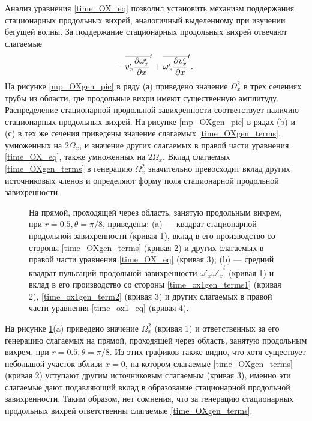 Анализ уравнения \eqref{time_OX_eq} позволил установить механизм поддержания стационарных продольных вихрей, аналогичный выделенному при изучении бегущей волны. За поддержание стационарных продольных вихрей отвечают слагаемые 
\begin{equation} \label{time_OXgen_terms}
- \overline{v'_x \frac{\partial \omega'_x}{\partial x}}^t + \overline{\omega'_x \frac{\partial v'_x}{\partial x}}^t. 
\end{equation}
На рисунке \ref{mp_OXgen_pic} в ряду (а) приведено значение $\Omega_x^2$ в трех сечениях трубы из области, где продольные вихри имеют существенную амплитуду. Распределение стационарной продольной завихренности соответствует наличию стационарных продольных вихрей. На рисунке \ref{mp_OXgen_pic} в рядах (b) и (с) в тех же сечения приведены значение слагаемых \eqref{time_OXgen_terms}, умноженных на $2\Omega_x$, и значение других слагаемых в правой части уравнения \eqref{time_OX_eq}, также умноженных на $2\Omega_x$. Вклад слагаемых \eqref{time_OXgen_terms} в генерацию $\Omega_x^2$ значительно превосходит вклад других источниковых членов и определяют форму поля стационарной продольной завихренности. 

\begin{figure}
\caption{На прямой, проходящей через область, занятую продольным вихрем, при $r = 0.5, \theta = \pi/8$, приведены: (a) --- квадрат стационарной продольной завихренности (кривая 1), вклад в его производство со стороны \eqref{time_OXgen_terms} (кривая  2) и других слагаемых в правой части уравнения \eqref{time_OX_eq} (кривая 3); (b) --- средний квадрат пульсаций продольной завихренности $\overline{\omega'_x \omega'_x}^t$ (кривая 1) и вклад в его производство со стороны \eqref{time_ox1gen_terms1} (кривая  2), \eqref{time_ox1gen_term2} (кривая  3) и других слагаемых в правой части уравнения \eqref{time_ox1_eq} (кривая  4).}
\label{xline_oxgen_pic}
\end{figure}

На рисунке \ref{xline_oxgen_pic}(a) приведено значение $\Omega_x^2$ (кривая 1) и ответственных за его генерацию слагаемых на прямой, проходящей через область, занятую продольным вихрем, при $r = 0.5, \theta = \pi/8$. Из этих графиков также видно, что хотя существует небольшой участок вблизи $x=0$, на котором слагаемые \eqref{time_OXgen_terms} (кривая 2) уступают другим источниковым слагаемым (кривая 3), именно эти слагаемые дают подавляющий вклад в образование стационарной продольной завихренности. Таким образом, нет сомнения, что за генерацию стационарных продольных вихрей ответственны слагаемые \eqref{time_OXgen_terms}. 

